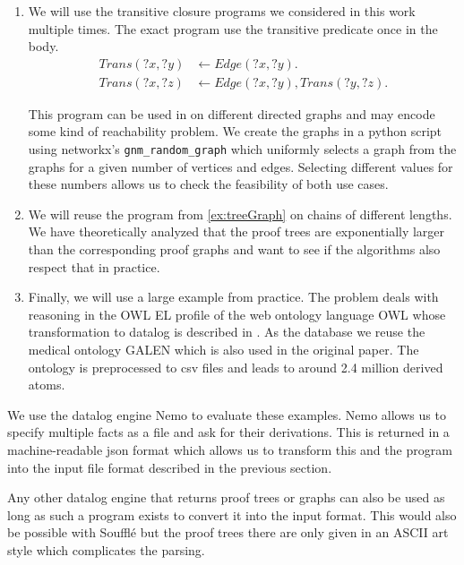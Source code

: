 \begin{enumerate}
    \item We will use the transitive closure programs we considered in this work multiple times. The exact program use the transitive predicate once in the body.
    \begin{equation}
        \begin{split}
            Trans(?x, ?y) &\leftarrow Edge(?x, ?y). \\
            Trans(?x, ?z) &\leftarrow Edge(?x, ?y),  Trans(?y, ?z). 
        \end{split}
    \end{equation}

    This program can be used in on different directed graphs and may encode some kind of reachability problem. We create the graphs in a python script using networkx's \lstinline|gnm_random_graph| which uniformly selects a graph from the graphs for a given number of vertices and edges. Selecting different values for these numbers allows us to check the feasibility of both use cases.

    \item We will reuse the program from \cref{ex:treeGraph} on chains of different lengths. We have theoretically analyzed that the proof trees are exponentially larger than the corresponding proof graphs and want to see if the algorithms also respect that in practice.
    
    \item Finally, we will use a large example from practice. The problem deals with reasoning in the OWL EL profile of the web ontology language OWL whose transformation to datalog is described in \cite{ELK}. As the database we reuse the medical ontology GALEN which is also used in the original paper. The ontology is preprocessed to csv files and leads to around 2.4 million derived atoms.
\end{enumerate}

We use the datalog engine Nemo\cite{Nemo} to evaluate these examples. Nemo allows us to specify multiple facts as a file and ask for their derivations. This is returned in a machine-readable json format which allows us to transform this and the program into the input file format described in the previous section.

Any other datalog engine that returns proof trees or graphs can also be used as long as such a program exists to convert it into the input format. This would also be possible with Soufflé\cite{Souffle} but the proof trees there are only given in an ASCII art style which complicates the parsing.

